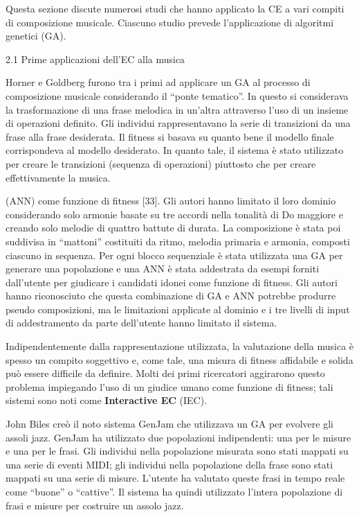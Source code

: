 \documentclass[a4paper,12pt]{report}
\begin{document}
Questa sezione discute numerosi studi che hanno applicato la CE a vari compiti di composizione musicale. 
Ciascuno studio prevede l'applicazione di algoritmi genetici (GA).

2.1 Prime applicazioni dell'EC alla musica

Horner e Goldberg furono tra i primi ad applicare un GA al processo di composizione musicale considerando il “ponte tematico”. 
In questo si considerava la trasformazione di una frase melodica in un'altra attraverso l'uso di un insieme di operazioni definito. 
Gli individui rappresentavano la serie di transizioni da una frase alla frase desiderata. 
Il fitness si basava su quanto bene il modello finale corrispondeva al modello desiderato. 
In quanto tale, il sistema è stato utilizzato per creare le transizioni (sequenza di operazioni) piuttosto che per creare effettivamente la musica. 

 (ANN) come funzione di fitness [33]. 
 Gli autori hanno limitato il loro dominio considerando solo armonie basate su tre accordi nella tonalità di Do maggiore e creando solo melodie di quattro battute di durata. La composizione è stata poi suddivisa in “mattoni” costituiti da ritmo, melodia primaria e armonia, composti ciascuno in sequenza. 
 Per ogni blocco sequenziale è stata utilizzata una GA per generare una popolazione e una ANN è stata addestrata da esempi forniti dall'utente per giudicare i candidati idonei come funzione di fitness. 
 Gli autori hanno riconosciuto che questa combinazione di GA e ANN potrebbe produrre pseudo composizioni, 
 ma le limitazioni applicate al dominio e i tre livelli di input di addestramento da parte dell'utente hanno limitato il sistema.
 
Indipendentemente dalla rappresentazione utilizzata, la valutazione della musica è spesso un compito soggettivo e, come tale, una misura di fitness affidabile e solida può essere difficile da definire. Molti dei primi ricercatori aggirarono questo problema impiegando l'uso di un giudice umano come funzione di fitness; 
tali sistemi sono noti come \textbf{Interactive EC} (IEC). 

John Biles creò il noto sistema GenJam che utilizzava un GA per evolvere gli assoli jazz. 
GenJam ha utilizzato due popolazioni indipendenti: una per le misure e una per le frasi. 
Gli individui nella popolazione misurata sono stati mappati su una serie di eventi MIDI; 
gli individui nella popolazione della frase sono stati mappati su una serie di misure. 
L’utente ha valutato queste frasi in tempo reale come “buone” o “cattive”. 
Il sistema ha quindi utilizzato l'intera popolazione di frasi e misure per costruire un assolo jazz. 
\end{document}
